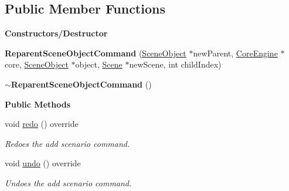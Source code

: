\subsection*{Public Member Functions}
\begin{Indent}\textbf{ Constructors/\+Destructor}\par
\begin{DoxyCompactItemize}
\item 
\mbox{\label{classrev_1_1_reparent_scene_object_command_adfcec15af186579adf4faf315302dcae}} 
{\bfseries Reparent\+Scene\+Object\+Command} (\mbox{\hyperlink{classrev_1_1_scene_object}{Scene\+Object}} $\ast$new\+Parent, \mbox{\hyperlink{classrev_1_1_core_engine}{Core\+Engine}} $\ast$core, \mbox{\hyperlink{classrev_1_1_scene_object}{Scene\+Object}} $\ast$object, \mbox{\hyperlink{classrev_1_1_scene}{Scene}} $\ast$new\+Scene, int child\+Index)
\item 
\mbox{\label{classrev_1_1_reparent_scene_object_command_ac57e77ee9e5cf3107570c25e61ab6c4f}} 
{\bfseries $\sim$\+Reparent\+Scene\+Object\+Command} ()
\end{DoxyCompactItemize}
\end{Indent}
\begin{Indent}\textbf{ Public Methods}\par
\begin{DoxyCompactItemize}
\item 
\mbox{\label{classrev_1_1_reparent_scene_object_command_ad982f67e4b3c5a50f4a9a031261b638b}} 
void \mbox{\hyperlink{classrev_1_1_reparent_scene_object_command_ad982f67e4b3c5a50f4a9a031261b638b}{redo}} () override
\begin{DoxyCompactList}\small\item\em Redoes the add scenario command. \end{DoxyCompactList}\item 
\mbox{\label{classrev_1_1_reparent_scene_object_command_a5ad5deece469b45bf3863f20ac52f6d7}} 
void \mbox{\hyperlink{classrev_1_1_reparent_scene_object_command_a5ad5deece469b45bf3863f20ac52f6d7}{undo}} () override
\begin{DoxyCompactList}\small\item\em Undoes the add scenario command. \end{DoxyCompactList}\end{DoxyCompactItemize}
\end{Indent}
